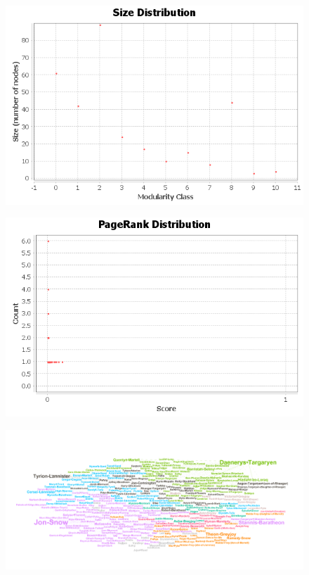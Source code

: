 \documentclass[]{article}
\begin{document}
\begin{figure}[htbp]  
\centering
\includegraphics{modb5/communities-size-distribution.png}
\end{figure}

\begin{figure}[htbp]  
\centering
\includegraphics{prb5/pageranks.png}
\end{figure}

\begin{figure}[htbp]  
\centering
\includegraphics{b5.png}
\end{figure}
\end{document}
